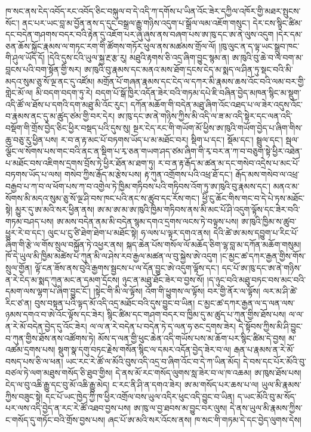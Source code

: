\documentclass{article}
\begin{document}
ཁ་སང་ནས་ངེད་འབོད་རང་འབོད་ཅིང་བསྐུལ་བ་དེ་འདི་ཀ་དགོས་པ་ཡིན་འོང་ཟེར་དཀྱིལ་འཁོར་གྱི་མཐར་སྤུངས་སོང་། ནང་པར་ཡང་བླ་མ་བྱོན་ནས་ད་དུང་བསྒྲལ་རྒྱུ་གཉིས་འདུག་པ་སྒྲོལ་ལམ་འཇོག་གསུང་། དེར་ངས་སྙིང་ཚིམ་དང་བདེན་གཤགས་བདར་བའི་རྟེན་དུ་འཇོག་པར་ཞུ་ཞུས་ནས་བཞག་པས་ཨ་ཁུ་དང་ཨ་ནེ་ལུས་འདུག །དེར་དམ་ཅན་ཆོས་སྐྱོང་རྣམས་ལ་གཏང་རག་གི་ཚོགས་གཏོར་ཕུལ་ནས་མཚམས་གྲོལ་ལོ། །ཁུ་ལུང་ན་ད་ལྟ་ཡང་སྒྲུབ་ཁང་གི་ཤུལ་ཡོད་དོ། །དེའི་དུས་ངའི་ཡུལ་སྐྱ་རྔ་རྩ་རུ། མཐུའི་རྟགས་ཅི་འདྲ་ཞིག་བྱུང་སྙམ་ན། ཨ་ཁུའི་བུ་ཆེ་བ་ལ་བག་མ་བླངས་པའི་བག་སྟོན་གྱི་སར། ཨ་ཁུའི་བུ་རྣམས་དང་མནའ་མས་ཐོག་དྲངས་ངེད་མ་སྨད་ལ་ཤིན་ཏུ་སྡང་བའི་མི་མདའ་སུམ་ཅུ་སོ་ལྔ་ནང་དུ་འཛོམ། མགྲོན་པོ་གཞན་རྣམས་དང་ངེད་ལ་དཀར་མི་རྣམས་ཆས་འོང་བའི་ལམ་བར་གྱི་གླེང་མོ་ལ། མི་བདག་བདག་ཏུ་རེ། བདག་པོ་སྒོ་ཁྱིར་འདོན་ཟེར་བའི་གཏམ་དཔེ་ཇི་བཞིན་བྱེད་མཁན་སྙིང་མ་སྡུག་འདི་ཚོ་ལ་ཐོས་པ་དགའི་དག་མཐུ་མི་འོང་རུང་། དཀོན་མཆོག་གི་བདེན་མཐུ་ཞིག་འོང་འཐད་པ་ལ་ཟེར་འདུས་འོང་བ་རྣམས་ནང་དུ་མ་ཚུད་ཙམ་གྱི་བར་དེར། ཨ་ཁུ་དང་ཨ་ནེ་གཉིས་ཀྱིས་མི་འདི་ལ་ཟ་མ་འདི་སྟེར་དང་ལན་འདི་བསྡོག་གི་གྲོས་བྱེད་ཅིང་ཕྱིར་བསྡད་པའི་དུས་སུ། སྔར་ངེད་རང་གི་གཡོག་མོ་ཕྱིས་ཨ་ཁུའི་གཡོག་བྱེད་པ་ཞིག་གིས་ཆུ་བཅུ་རུ་ཕྱིན་པས། ར་བ་ན་རྟ་མང་པོ་བཏགས་ཡོད་པ་མ་མཐོང་བར། སྡིག་པ་དང་། སྡོམ་དང་། སྦྲུལ་དང་། སྦལ་ལྕོང་ལ་སོགས་པས་གང་བའི་ནང་ན་སྡིག་པ་རྭ་ཅན་གཡག་ཤད་ཙམ་ཞིག་གི་རྭ་བར་ན་ཀ་བ་བཅུག་སྟེ་ཕྱིར་འཐེན་པ་མཐོང་བས་འཇིགས་དྲགས་བྲོས་ཏེ་ཕྱིར་ཐོན་མ་ཐག་ཏུ། ར་བ་ན་རྟ་རྒོད་མ་ཚན་མ་དང་གསེབ་འདྲེས་པ་མང་པོ་བཏགས་ཡོད་པ་ལས། གསེབ་ཀྱིས་རྒོད་མ་རྩེས་པས། རྟ་ཀུན་འགྲོགས་པའི་འཕྲ་ཐོ་དང་། རྒོད་མས་གསེབ་ལ་འཕྲ་བརྒྱབ་པ་ཀ་བ་ལ་ཕོག་པས་ཀ་བ་འགྱེལ་ཏེ་ཁྱིམ་གཏིབས་པའི་གཏིབས་འོག་ཏུ་ཨ་ཁུའི་བུ་རྣམས་དང་། མནའ་མ་སོགས་མི་མདའ་སུམ་ཅུ་སོ་ལྔ་ཤི་བས་ཁང་པའི་ནང་ས་ཚུབ་དང་རོས་གང་། ཕྱི་ངུ་ཆོང་གིས་གང་བ་དེ་པེ་ཏས་མཐོང་སྟེ། མྱུར་དུ་ཨ་མའི་སར་ཕྱིན་ནས། ཨ་མ་ཨ་མ་ཨ་ཁུའི་ཁྱིམ་གཏིབས་ནས་མི་མང་པོ་ཤི་འདུག་ལྟོས་དང་ཟེར་བའི་གཏམ་བཤད་པས། ཨ་མས་བདེན་ནམ་མི་བདེན་སྙམ་དགའ་དྲགས་ལངས་ཏེ་བལྟས་པས། ཨ་ཁུའི་ཁྱིམ་ས་ཚུབ་ཕྱུར་རེ་བ་དང་། ལུང་པ་ངུ་ཙི་ཐེག་ཐེག་པ་མཐོང་སྟེ། ཧ་ལས་པ་ལྟར་དགའ་ནས། དེའི་ཚེ་ཨ་མས་དབྱུག་པ་རིང་པོ་ཞིག་གི་རྩེ་ལ་གོས་སྲུལ་བསྐྱོན་ཏེ་འཕྱར་ནས། སྐད་ཆེན་པོས་གསོལ་ལོ་མཆོད་ཅིག་ལྷ་བླ་མ་དཀོན་མཆོག་གསུམ། ཁོ་དེ་ཡུལ་མི་ཁྱིམ་མཚེས་པ་ཀུན་མི་ལ་ཤེས་རབ་རྒྱལ་མཚན་ལ་བུ་སྐྱེས་ཨེ་འདུག །ང་མྱང་ཚ་དཀར་རྒྱན་གྱིས་གོས་སྲུལ་གྱོན། ལྟོ་ངན་ཟོས་ནས་བུའི་རྒྱགས་སྦྱངས་པ་ལ་དོན་བྱུང་ཨེ་འདུག་ལྟོས་དང་། དང་པོ་ཨ་ཁུ་དང་ཨ་ནེ་གཉིས་ན་རེ་ངེད་མ་སྨད་ཀུན་མང་ན་དམག་དྲོངས། ཉུང་ན་མཐུ་ཐོང་ཟེར་བ་བྱས་སོ། །ད་ཉུང་བའི་མཐུ་བཏང་བས་མང་བའི་དམག་ལས་ལྷག་པ་ཞིག་བྱུང་ངོ་། །སྟེང་གི་མི་ལ་ལྟོས། འོག་གི་ཕྱུགས་ལ་ལྟོས། བར་གྱི་ནོར་ལ་ལྟོས། ལར་མ་ཤི་ཚེ་རིང་ཙ་ན། བུས་བསྟན་པའི་ལྟད་མོ་འདི་འདྲ་མཐོང་བའི་དུས་བྱུང་བ་ཡིན། ང་མྱང་ཚ་དཀར་རྒྱན་ལ་ད་ལན་ལས་ཉམས་དགའ་བ་ཨེ་འོང་ལྟོས་དང་ཟེར། སྙིང་ཚིམ་དང་གཤག་བདར་བ་ཁྱིམ་དུ་མ་ཚུད་པ་ཀུན་གྱིས་ཐོས་པས། ལ་ལ་ན་རེ་མོ་བདེན་བྱེད་དུ་འོང་ཟེར། ལ་ལ་ན་རེ་བདེན་པ་བདེན་ཏེ་ད་ལན་ཧ་ཅང་དྲགས་ཟེར། དེ་སྟོབས་ཀྱིས་མི་ཤི་བྱུང་བ་ཀུན་གྱིས་ཐོས་ནས་འཚོགས་ཏེ། མོས་ད་ལན་གྱི་ཕུང་ཆེན་འདི་གཡོས་པས་མ་ཆོག་པར་སྙིང་ཚིམ་དེ་བྱས། མ་འཚམ་དྲགས་པས། སྡུག་སྣ་དགུ་བཏང་རྗེས་གསོན་སྙིང་ལ་དམར་འདོན་བྱེད་ཟེར་བ་ལ། རྒན་པ་རྣམས་ན་རེ་མོ་བསད་པས་ཅི་ལ་ཕན། ཡང་རང་རེ་ཚོ་ལ་མོའི་བུས་འདི་འདྲ་བ་ཞིག་འོང་བ་དེ་ཀ་ཡིན་མོད། དེ་བས་དང་པོར་མོའི་བུ་བཙལ་ཏེ་ལག་མཐུས་གསོད་ཅི་ཐུབ་གྱིས། དེ་ནས་མོ་རང་གསོད་ལུགས་སླ་ཟེར་བ་ལ་ཁ་འཆམ། ཨ་ཁུས་ཐོས་པས། ངེད་ལ་བུ་འཆི་རྒྱུ་དང་བུ་མོ་འཆི་རྒྱུ་མེད། ང་རང་ནི་ཤི་ན་དགའ་ཟེར། ཨ་མ་གསོད་པར་ཆས་པ་ལ། ཡུལ་མི་རྣམས་ཀྱིས་བཟུང་སྟེ། དང་པོ་ཡང་ཁྱེད་ཀྱི་ཁ་ཕྱིར་འགྲོལ་བས་ཡུལ་འདིར་ཕུང་འདི་བྱུང་བ་ཡིན། ད་ཡང་མོའི་བུ་མ་སོད་པར་ལས་འདི་བྱེད་ན་རང་རེ་ཚོ་འཐབ་བྱས་པས། ཨ་ཁུ་ལ་བྱ་ཐབས་མ་བྱུང་བར་ལུས། དེ་ནས་ཡུལ་མི་རྣམས་ཀྱིས་ང་གསོད་དུ་གཏོང་བའི་གྲོས་བྱས་པས། ཞང་པོ་ཨ་མའི་སར་འོངས་ནས། ཁ་སང་གི་གཏམ་དེ་དང་བྱེད་ལུགས་དེས། 
\end{document}
